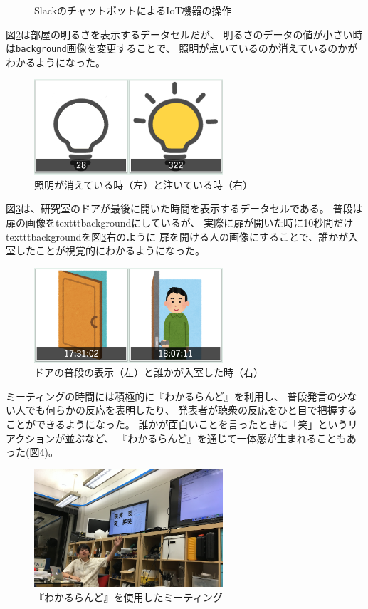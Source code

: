 \begin{figure}[h]
\centering
{}
\caption{SlackのチャットボットによるIoT機器の操作}
\label{slack}
\end{figure}

図\ref{light}は部屋の明るさを表示するデータセルだが、
明るさのデータの値が小さい時は\texttt{background}画像を変更することで、
照明が点いているのか消えているのかがわかるようになった。

\begin{figure}[h]
\centering
\includegraphics[width=7cm]{images/light.png}
\caption{照明が消えている時（左）と注いている時（右）}
\label{light}
\end{figure}

図\ref{door}は、研究室のドアが最後に開いた時間を表示するデータセルである。
普段は扉の画像をtexttt{background}にしているが、
実際に扉が開いた時に10秒間だけtexttt{background}を図\ref{door}右のように
扉を開ける人の画像にすることで、誰かが入室したことが視覚的にわかるようになった。

\begin{figure}[h]
\centering
\includegraphics[width=7cm]{images/door.png}
\caption{ドアの普段の表示（左）と誰かが入室した時（右）}
\label{door}
\end{figure}

ミーティングの時間には積極的に『わかるらんど』を利用し、
普段発言の少ない人でも何らかの反応を表明したり、
発表者が聴衆の反応をひと目で把握することができるようになった。
誰かが面白いことを言ったときに「笑」というリアクションが並ぶなど、
『わかるらんど』を通じて一体感が生まれることもあった(図\ref{wara})。

\begin{figure}[h]
\centering
\includegraphics[width=7cm]{images/wara.png}
\caption{『わかるらんど』を使用したミーティング}
\label{wara}
\end{figure}